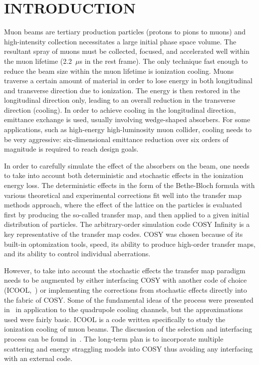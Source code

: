 \documentclass{jacow}
\begin{document}
\section{INTRODUCTION}
Muon beams are tertiary production particles (protons to pions to muons) and high-intensity collection necessitates a large initial phase space volume. The resultant spray of muons must be collected, focused, and accelerated well within the muon lifetime (2.2~$\mu$s in the rest frame). The only technique fast enough to reduce the beam size within the muon lifetime is ionization cooling. Muons traverse a certain amount of material in order to lose energy in both longitudinal and transverse direction due to ionization. The energy is then restored in the longitudinal direction only, leading to an overall reduction in the transverse direction (cooling). In order to achieve cooling in the longitudinal direction, emittance exchange is used, usually involving wedge-shaped absorbers. For some applications, such as high-energy high-luminosity muon collider, cooling needs to be very aggressive: six-dimensional emittance reduction over six orders of magnitude is required to reach design goals.

In order to carefully simulate the effect of the absorbers on the beam, one needs to take into account both deterministic and stochastic effects in the ionization energy loss. The deterministic effects in the form of the Bethe-Bloch formula with various theoretical and experimental corrections fit well into the transfer map methods approach, where the effect of the lattice on the particles is evaluated first by producing the so-called transfer map, and then applied to a given initial distribution of particles. The arbitrary-order simulation code COSY Infinity \cite{COSY} is a key representative of the transfer map codes. COSY was chosen because of its built-in optomization tools, speed, its ability to produce high-order transfer maps, and its ability to control individual aberrations. 

However, to take into account the stochastic effects the transfer map paradigm needs to be augmented by either interfacing COSY with another code of choice (ICOOL,~\cite{ICOOL}) or implementing the corrections from stochastic effects directly into the fabric of COSY. Some of the fundamental ideas of the process were presented in~\cite{errede} in application to the quadrupole cooling channels, but the approximations used were fairly basic. ICOOL is a code written specifically to study the ionization cooling of muon beams. The discussion of the selection and interfacing process can be found in~\cite{napac13}. The long-term plan is to incorporate multiple scattering and energy straggling models into COSY thus avoiding any interfacing with an external code.
\end{document}
